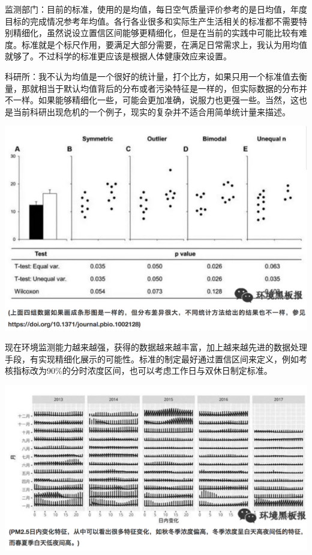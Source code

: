 \documentclass[]{book}
\begin{document}
监测部门：目前的标准，使用的是均值，每日空气质量评价参考的是日均值，年度目标的完成情况参考年均值。各行各业很多和实际生产生活相关的标准都不需要特别精细化，虽然说设立置信区间能够更精细化，但是在当前的实践中可能比较有难度。标准就是个标尺作用，要满足大部分需要，在满足日常需求上，我认为用均值就够了。不过科学的标准更应该是根据人体健康效应来设置。

科研所：我不认为均值是一个很好的统计量，打个比方，如果只用一个标准值去衡量，那就相当于默认均值背后的分布或者污染特征是一样的，但实际数据的分布并不一样。如果能够精细化一些，可能会更加准确，说服力也更强一些。当然，这也是当前科研出现危机的一个例子，现实的复杂并不适合用简单统计量来描述。

\includegraphics[width=8.33in]{images/air3}

现在环境监测能力越来越强，获得的数据越来越丰富，加上越来越先进的数据处理手段，有实现精细化展示的可能性。标准的制定最好通过置信区间来定义，例如考核指标改为90\%的分时浓度区间，也可以考虑工作日与双休日制定标准。

\includegraphics[width=8.33in]{images/air4}
\end{document}
